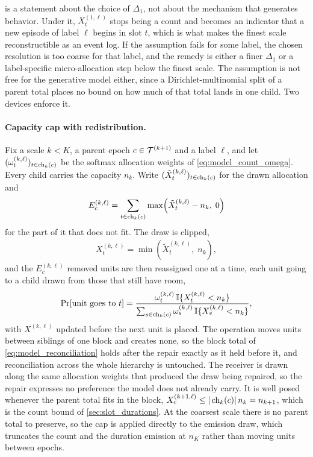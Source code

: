  is a statement about the choice of $\Delta_1$,
not about the mechanism that generates behavior. Under it, $X_t^{(1,\ell)}$
stops being a count and becomes an indicator that a new episode of label $\ell$
begins in slot $t$, which is what makes the finest scale reconstructible as an
event log. If the assumption fails for some label, the chosen resolution is too
coarse for that label, and the remedy is either a finer $\Delta_1$ or a
label-specific micro-allocation step below the finest scale. The assumption is
not free for the generative model either, since a Dirichlet-multinomial split
of a parent total places no bound on how much of that total lands in one child.
Two devices enforce it.

\paragraph{Capacity cap with redistribution.}
Fix a scale $k < K$, a parent epoch $c \in {\mathcal{T}}^{(k+1)}$ and a label $\ell$, and
let $(\omega_t^{(k,\ell)})_{t \in \operatorname{ch}_k(c)}$ be the softmax allocation
weights of \cref{eq:model_count_omega}. Every child carries the capacity $n_k$.
Write $(\tilde{X}_t^{(k,\ell)})_{t \in \operatorname{ch}_k(c)}$ for the drawn allocation
and
\begin{align}
E_c^{(k,\ell)}
=
\sum_{t \in \operatorname{ch}_k(c)}
\max\!\left( \tilde{X}_t^{(k,\ell)} - n_k, \; 0 \right)
\label{eq:capacity_excess}
\end{align}
for the part of it that does not fit. The draw is clipped,
\begin{align}
X_t^{(k,\ell)} = \min\!\left( \tilde{X}_t^{(k,\ell)}, \; n_k \right),
\label{eq:capacity_clip}
\end{align}
and the $E_c^{(k,\ell)}$ removed units are then reassigned one at a time, each
unit going to a child drawn from those that still have room,
\begin{align}
\Pr\!\left[\text{unit goes to } t\right]
=
\frac{\omega_t^{(k,\ell)} \,
      \mathbb{I}\{X_t^{(k,\ell)} < n_k\}}
     {\sum_{s \in \operatorname{ch}_k(c)} \omega_s^{(k,\ell)} \,
      \mathbb{I}\{X_s^{(k,\ell)} < n_k\}} ,
\label{eq:capacity_redistribution}
\end{align}
with $X^{(k,\ell)}$ updated before the next unit is placed. The operation moves
units between siblings of one block and creates none, so the block total of
\cref{eq:model_reconciliation} holds after the repair exactly as it held
before it, and reconciliation across the whole hierarchy is untouched. The
receiver is drawn along the same allocation weights that produced the draw
being repaired, so the repair expresses no preference the model does not
already carry. It is well posed whenever the parent total fits in the block,
$X_c^{(k+1,\ell)} \le |\operatorname{ch}_k(c)| \, n_k = n_{k+1}$, which is the count bound
of \cref{sec:slot_durations}. At the coarsest scale there is no parent total to
preserve, so the cap is applied directly to the emission draw, which truncates
the count and the duration emission at $n_K$ rather than moving units between
epochs.

